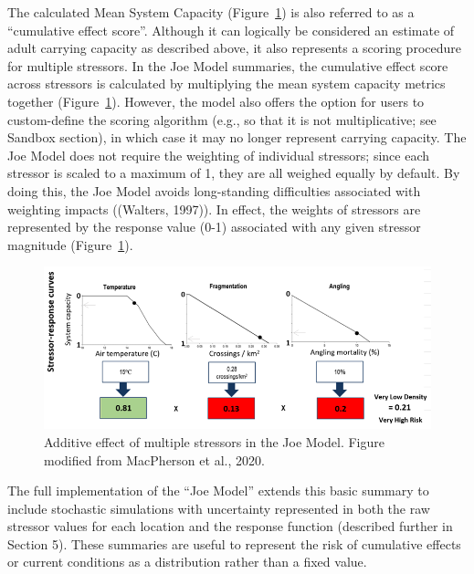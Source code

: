\documentclass[
  letterpaper,
  DIV=11,
  numbers=noendperiod]{scrreprt}
\begin{document}
The calculated Mean System Capacity (Figure~\ref{fig-figure4}) is also
referred to as a ``cumulative effect score''. Although it can logically
be considered an estimate of adult carrying capacity as described above,
it also represents a scoring procedure for multiple stressors. In the
Joe Model summaries, the cumulative effect score across stressors is
calculated by multiplying the mean system capacity metrics together
(Figure~\ref{fig-figure4}). However, the model also offers the option
for users to custom-define the scoring algorithm (e.g., so that it is
not multiplicative; see Sandbox section), in which case it may no longer
represent carrying capacity. The Joe Model does not require the
weighting of individual stressors; since each stressor is scaled to a
maximum of 1, they are all weighed equally by default. By doing this,
the Joe Model avoids long-standing difficulties associated with
weighting impacts ((Walters, 1997)). In effect, the weights of stressors
are represented by the response value (0-1) associated with any given
stressor magnitude (Figure~\ref{fig-figure4}).

\begin{figure}

{\centering \includegraphics{images/image008.png}

}

\caption{\label{fig-figure4}Additive effect of multiple stressors in the
Joe Model. Figure modified from MacPherson et al., 2020.}

\end{figure}

The full implementation of the ``Joe Model'' extends this basic summary
to include stochastic simulations with uncertainty represented in both
the raw stressor values for each location and the response function
(described further in Section 5). These summaries are useful to
represent the risk of cumulative effects or current conditions as a
distribution rather than a fixed value.
\end{document}
